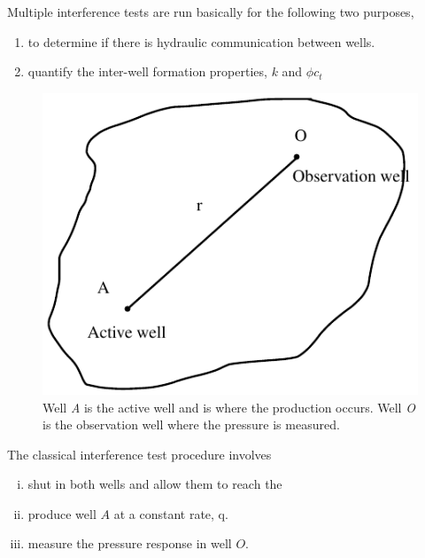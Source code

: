 \documentclass{llncs}
\numberwithin{equation}{section}
\numberwithin{figure}{section}
\numberwithin{table}{section}
\begin{document}
    Multiple interference tests are run basically for the following two purposes,

    \begin{enumerate}[(1)]
        \item   to determine if there is hydraulic communication between wells.
        \item   quantify the inter-well formation properties, $k$ and $\phi c_{t}$
    \end{enumerate}

    \begin{figure}
        \begin{center}
        \includegraphics[scale=1]{Active_Obser_well.pdf}
        \end{center}
        \caption{Well \emph{A} is the active well and is where the production occurs. Well \emph{O} is the observation well where the pressure is measured.}
        \label{Active_Obser_well}
    \end{figure}

    The classical interference test procedure involves

    \begin{enumerate}[(i)]
        \item   shut in both wells and allow them to reach the 
        \item   produce well $A$ at a constant rate, q.
        \item   measure the pressure response in well $O$.
    \end{enumerate}
\end{document}
